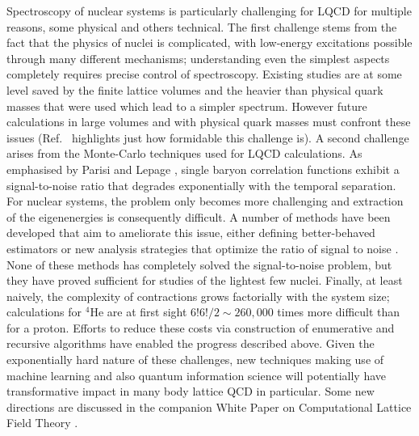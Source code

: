 Spectroscopy of nuclear systems is particularly challenging for LQCD for multiple reasons, some physical and others technical. The first challenge stems from the fact that the physics of nuclei is complicated, with low-energy excitations possible through many different mechanisms; understanding even the simplest aspects completely requires precise control of spectroscopy. Existing studies are at some level saved by the finite lattice volumes and the heavier than physical quark masses that were used which lead to a simpler spectrum. However future calculations in large volumes and with physical quark masses must confront these issues (Ref.~\cite{Beane:2012vq} highlights just how formidable this challenge is).
A second challenge arises from the Monte-Carlo techniques used for LQCD calculations. As emphasised by Parisi and Lepage \cite{Lepage:1989hd,Parisi:1983ae,Hamber:1983vu}, single baryon correlation functions exhibit a signal-to-noise ratio that degrades exponentially with the temporal separation. For nuclear systems, the problem only becomes more challenging \cite{Beane:2009kya,Beane:2009gs} and extraction of the eigenenergies is consequently difficult. A number of methods have been developed that aim to ameliorate this issue, either defining better-behaved estimators \cite{Beane:2014oea,Wagman:2017gqi,Wagman:2017xfh,Wagman:2016bam,Detmold:2018eqd} or new analysis strategies that optimize the ratio of signal to noise \cite{Detmold:2014hla}. None of these methods has completely solved the signal-to-noise problem, but they have proved sufficient for studies of the lightest few nuclei. 
Finally, at least naively, the complexity of contractions grows 
factorially with the system size; calculations for $^4$He are at first sight $6!6!/2\sim 260,000$ times  more difficult than for a proton. Efforts to reduce these costs via construction of enumerative \cite{Doi:2012xd,Gunther:2013xj} and recursive \cite{Detmold:2010au,Detmold:2012eu} algorithms have enabled the progress described above. 
Given the exponentially hard nature of these challenges, new techniques making use of machine learning and also quantum information science will potentially have transformative  impact 
in  many body lattice QCD in particular. Some new directions are discussed in the companion White Paper on Computational Lattice Field Theory \cite{Joo:2018qcd}.


